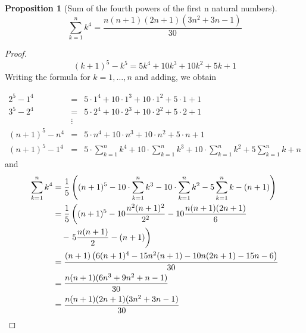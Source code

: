 \documentclass{book}
\theoremstyle{plain}%
\newtheorem{prop}[thm]{Proposition}
\theoremstyle{definition}
\theoremstyle{remark}
\begin{document}
\begin{prop}[Sum of the fourth powers of the first n natural numbers]
	\begin{equation}
		\sum_{k = 1}^n k^4 = \frac{n(n + 1)(2n + 1)(3n^2 + 3n - 1)}{30}
	\end{equation}

\end{prop}
\begin{proof}
	\begin{equation}
		(k + 1)^5 - k^5 = 5 k^4 + 10 k^3 + 10 k^2 + 5 k + 1
	\end{equation}
	Writing the formula for $k = 1, \dots, n$ and adding, we obtain

	\begin{equation*}
		\begin{array}{rcl}
			2^5 - 1^4       & =      & 5 \cdot 1^4 + 10 \cdot 1^3 + 10 \cdot 1^2 + 5 \cdot 1 + 1                                                                                                                 \\
			3^5 - 2^4       & =      & 5 \cdot 2^4 + 10 \cdot 2^3 + 10 \cdot 2^2 + 5 \cdot 2 + 1                                                                                                                 \\
			                & \vdots &                                                                                                                                                                           \\
			(n + 1)^5 - n^4 & =      & 5 \cdot n^4 + 10 \cdot n^3 + 10 \cdot n^2 + 5 \cdot n + 1                                                                                                                 \\
			\hline
			(n + 1)^5 - 1^4 & =      & 5 \cdot \displaystyle\sum_{k = 1}^n k^4 + 10 \cdot \displaystyle\sum_{k = 1}^{n} k^3 + 10 \cdot \displaystyle\sum_{k = 1}^{n} k^2 + 5 \displaystyle\sum_{k = 1}^{n} k + n
		\end{array}
	\end{equation*}
	and
	\begin{align*}
		\sum_{k = 1}^n k^4 & = \frac{1}{5}\left((n + 1)^5 - 10 \cdot \sum_{k = 1}^{n} k^3 - 10 \cdot \sum_{k = 1}^{n} k^2 - 5 \sum_{k = 1}^{n} k - (n + 1)\right) \\
		                   & = \frac{1}{5} \left((n + 1)^5 - 10 \frac{n^2 (n + 1)^2}{2^2} - 10 \frac{n (n + 1)(2n + 1)}{6} \right.                                \\
		                   & \quad - \left. 5 \frac{n(n + 1)}{2} - (n + 1) \vphantom{\frac{1^2}{1^2}}\right)                                                      \\
		                   & = \frac{(n + 1)\left(6(n + 1)^4 - 15 n^2 (n + 1) - 10 n(2n + 1) - 15n - 6\right)}{30}                                                \\
		                   & = \frac{n(n + 1)(6 n^3 + 9 n^2 + n - 1)}{30}                                                                                         \\
		                   & = \frac{n(n + 1)(2n + 1)(3n^2 + 3n - 1)}{30}
	\end{align*}
\end{proof}
\end{document}

